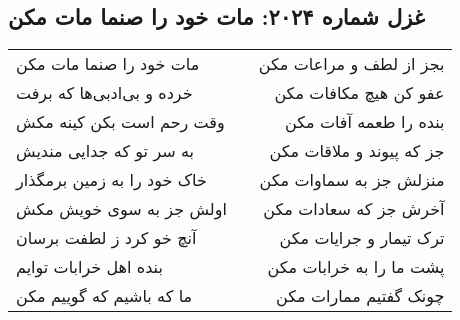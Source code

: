 \begin{center}
\section*{غزل شماره ۲۰۲۴: مات خود را صنما مات مکن}
\label{sec:2024}
\begin{longtable}{l p{0.5cm} r}
مات خود را صنما مات مکن
&&
بجز از لطف و مراعات مکن
\\
خرده و بی‌ادبی‌ها که برفت
&&
عفو کن هیچ مکافات مکن
\\
وقت رحم است بکن کینه مکش
&&
بنده را طعمه آفات مکن
\\
به سر تو که جدایی مندیش
&&
جز که پیوند و ملاقات مکن
\\
خاک خود را به زمین برمگذار
&&
منزلش جز به سماوات مکن
\\
اولش جز به سوی خویش مکش
&&
آخرش جز که سعادات مکن
\\
آنچ خو کرد ز لطفت برسان
&&
ترک تیمار و جرایات مکن
\\
بنده اهل خرابات توایم
&&
پشت ما را به خرابات مکن
\\
ما که باشیم که گوییم مکن
&&
چونک گفتیم ممارات مکن
\\
\end{longtable}
\end{center}
